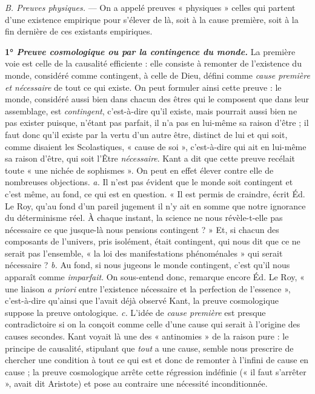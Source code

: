 {\it B. Preuves physiques.} — On a appelé preuves « physiques » celles
qui partent d’une existence empirique pour s'élever de là, soit à la
cause première, soit à la fin dernière de ces existants empiriques.

\vspace{0.24cm}
{\footnotesize
\textbf{1° \textit {\textsf{Preuve cosmologique ou par la contingence du monde.}}}
 La première voie
est celle de la causalité efficiente : elle consiste à remonter de l'existence
du monde, considéré comme contingent, à celle de Dieu, défini comme {\it cause
première et nécessaire} de tout ce qui existe. On peut formuler ainsi cette
preuve : le monde, considéré aussi bien dans chacun des êtres qui le composent
que dans leur assemblage, est {\it contingent}, c'est-à-dire qu'il existe,
mais pourrait aussi bien ne pas exister puisque, n'étant pas parfait, il n’a
pas en lui-même sa raison d’être ; il faut donc qu’il existe par la vertu d’un
autre être, distinct de lui et qui soit, comme disaient les Scolastiques,
« cause de soi », c’est-à-dire qui ait en lui-même sa raison d’être, qui soit
l'Être {\it nécessaire}.
Kant a dit que cette preuve recélait toute « une nichée de sophismes ».
On peut en effet élever contre elle de nombreuses objections. {\it a.} Il n’est pas
évident que le monde soit contingent et c’est même, au fond, ce qui est
en question. « Il est permis de craindre, écrit Éd. Le Roy, qu’au fond
d’un pareil jugement il n’y ait en somme que notre ignorance du déterminisme
réel. À chaque instant, la science ne nous révèle-t-elle pas nécessaire
ce que jusque-là nous pensions contingent ? » Et, si chacun des composants
de l'univers, pris isolément, était contingent, qui nous dit que ce
ne serait pas l'ensemble, « la loi des manifestations phénoménales » qui
serait nécessaire ? {\it b.} Au fond, si nous jugeons le monde contingent, c’est
qu’il nous apparaît comme {\it imparfait}. On sous-entend donc, remarque encore
Éd. Le Roy, « une liaison {\it a priori} entre l'existence nécessaire et la perfection
de l'essence », c’est-à-dire qu’ainsi que l'avait déjà observé Kant, la
preuve cosmologique suppose la preuve ontologique. {\it c.} L'idée de {\it cause
première} est presque contradictoire si on la conçoit comme celle d’une cause
qui serait à l’origine des causes secondes. Kant voyait là une des « antinomies »
de la raison pure : le principe de causalité, stipulant que {\it tout} a une
cause, semble nous prescrire de chercher une condition à tout ce qui est
et donc de remonter à l'infini de cause en cause ; la preuve cosmologique
arrête cette régression indéfinie (« il faut s'arrêter », avait dit Aristote)
et pose au contraire une nécessité inconditionnée.

}
